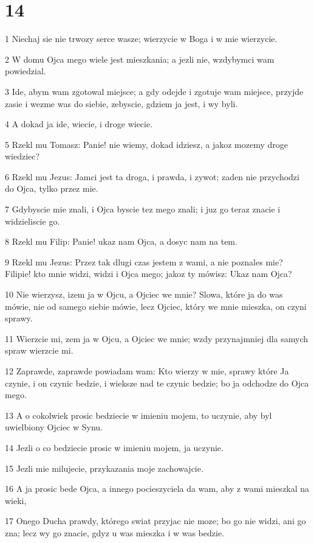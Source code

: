 \chapter{14}

\par 1 Niechaj sie nie trwozy serce wasze; wierzycie w Boga i w mie wierzycie.
\par 2 W domu Ojca mego wiele jest mieszkania; a jezli nie, wzdybymci wam powiedzial.
\par 3 Ide, abym wam zgotowal miejsce; a gdy odejde i zgotuje wam miejsce, przyjde zasie i wezme was do siebie, zebyscie, gdziem ja jest, i wy byli.
\par 4 A dokad ja ide, wiecie, i droge wiecie.
\par 5 Rzekl mu Tomasz: Panie! nie wiemy, dokad idziesz, a jakoz mozemy droge wiedziec?
\par 6 Rzekl mu Jezus: Jamci jest ta droga, i prawda, i zywot; zaden nie przychodzi do Ojca, tylko przez mie.
\par 7 Gdybyscie mie znali, i Ojca byscie tez mego znali; i juz go teraz znacie i widzieliscie go.
\par 8 Rzekl mu Filip: Panie! ukaz nam Ojca, a dosyc nam na tem.
\par 9 Rzekl mu Jezus: Przez tak dlugi czas jestem z wami, a nie poznales mie? Filipie! kto mnie widzi, widzi i Ojca mego; jakoz ty mówisz: Ukaz nam Ojca?
\par 10 Nie wierzysz, izem ja w Ojcu, a Ojciec we mnie? Slowa, które ja do was mówie, nie od samego siebie mówie, lecz Ojciec, który we mnie mieszka, on czyni sprawy.
\par 11 Wierzcie mi, zem ja w Ojcu, a Ojciec we mnie; wzdy przynajmniej dla samych spraw wierzcie mi.
\par 12 Zaprawde, zaprawde powiadam wam: Kto wierzy w mie, sprawy które Ja czynie, i on czynic bedzie, i wieksze nad te czynic bedzie; bo ja odchodze do Ojca mego.
\par 13 A o cokolwiek prosic bedziecie w imieniu mojem, to uczynie, aby byl uwielbiony Ojciec w Synu.
\par 14 Jezli o co bedziecie prosic w imieniu mojem, ja uczynie.
\par 15 Jezli mie milujecie, przykazania moje zachowajcie.
\par 16 A ja prosic bede Ojca, a innego pocieszyciela da wam, aby z wami mieszkal na wieki,
\par 17 Onego Ducha prawdy, którego swiat przyjac nie moze; bo go nie widzi, ani go zna; lecz wy go znacie, gdyz u was mieszka i w was bedzie.
